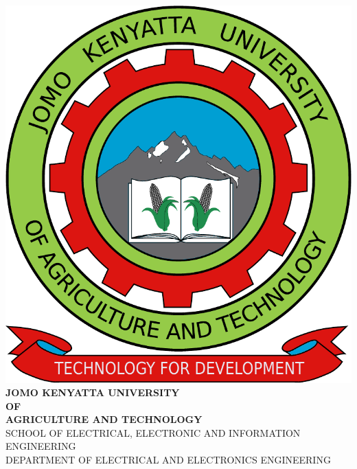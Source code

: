 \begin{spacing}{1.1}
\begin{titlepage}
  \begin{center}
    \includegraphics[scale=0.2]{Graphics/jkuat-logo.pdf}\\
		\vspace{0.5cm}
		\Large{\textbf{JOMO KENYATTA UNIVERSITY\\OF\\AGRICULTURE AND TECHNOLOGY\\}}
		\vspace{1cm}
		\small{SCHOOL OF ELECTRICAL, ELECTRONIC AND INFORMATION ENGINEERING\\
		DEPARTMENT OF ELECTRICAL AND ELECTRONICS ENGINEERING\\}
		\vspace*{\fill}
	

\end{center}
\end{titlepage}
\end{spacing}
